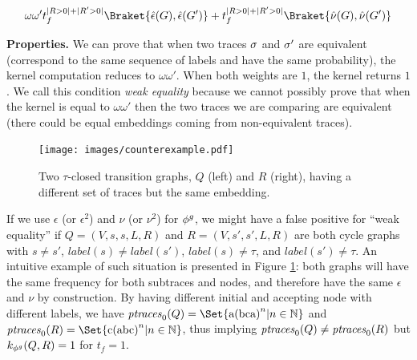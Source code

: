 
\begin{equation}\label{eq:corollLem1}
{\omega\omega't_f^{|R>0|+|R'>0|}\Braket{\hat{\epsilon}(G), \hat{\epsilon}(G')}+ t_f^{|R>0|+|R'>0|}\Braket{\hat{\nu}(G), \hat{\nu}(G')}}
\end{equation}

\noindent
\textbf{Properties.}\label{subsub:prop}
We can prove that when two traces $\logtrace$ and ${\nonlogtrace}$ are equivalent (correspond to the same sequence of labels and have the same probability), the kernel computation reduces to $\omega\omega'$. When both weights are $1$, the kernel returns $1$. We call this condition \textit{weak equality} because we cannot possibly prove that when the kernel is equal to $\omega\omega'$ then the two traces we are comparing are equivalent (there could be equal embeddings coming from non-equivalent traces). 

\begin{figure}[!t]
	\vspace*{-0.5cm}
	\centering
	\texttt{[image: images/counterexample.pdf]}
	\caption{Two $\tau$-closed transition graphs, $Q$ (left) and $R$ (right), having a different set of traces but the same embedding.}\label{fig:counterexample}
\end{figure}
\begin{example}
	If we use $\epsilon$ (or $\epsilon^2$) and $\nu$ (or $\nu^2$) for $\gorgembed$, we might have a false positive for ``weak equality'' if $Q=(V,s,s,L,R)$ and $R=(V,s',s',L,R)$ are both cycle graphs with $s\neq s'$, $\textit{label}(s)\neq\textit{label}(s')$, $\textit{label}(s)\neq\tau$, and $\textit{label}(s')\neq\tau$. An intuitive example of such situation is presented in Figure \ref{fig:counterexample}: both graphs will have the same frequency for both subtraces and nodes, and therefore have the same  $\epsilon$ and $\nu$ by construction. By having different initial and accepting node with  different labels, we have $\ptraces{Q}{0}=\Set{\textup{a(bca)}^n|n\in\mathbb{N}}$ and $\ptraces{R}{0}=\Set{\textup{c(abc)}^n|n\in\mathbb{N}}$, thus implying $\ptraces{Q}{0}\neq\ptraces{R}{0}$ but $k_{\gorgembed}(Q,R)=1$ for $t_f=1$.
\end{example}


